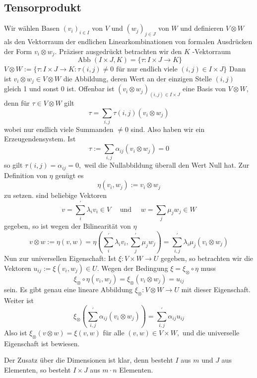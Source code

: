 \subsection{Tensorprodukt}

Wir wählen Basen $\left(v_{i}\right)_{i \in I}$ von $V$ und
$\left(w_{j}\right)_{j \in J}$ von $W$ und definieren $V \otimes W$ als den
Vektorraum der endlichen Linearkombinationen von formalen Ausdrücken der Form
$v_{i} \otimes w_{j} .$ Präziser ausgedrückt betrachten wir den $K$ -Vektorraum
\[
\operatorname{Abb}(I \times J, K)=\{\tau: I \times J \rightarrow K\}
\]
$V \otimes W:=\{\tau: I \times J \rightarrow K: \tau(i, j) \neq 0 \text { für nur endlich
viele }(i, j) \in I \times J\}$
Dann ist $v_{i} \otimes w_{j} \in V \otimes W$ die Abbildung, deren Wert an der einzigen
Stelle $(i, j)$ gleich 1 und sonst 0 ist. Offenbar ist
$\left(v_{i} \otimes w_{j}\right)_{(i, j) \in I \times J}$ eine Basis von $V \otimes W$,
denn für $\tau \in V \otimes W$ gilt
\[
\tau=\sum_{i, j} \tau(i, j)\left(v_{i} \otimes w_{j}\right)
\]
wobei nur endlich viele Summanden $\neq 0$ sind. Also haben wir ein Erzeugendensystem. Ist
\[
\tau:=\sum_{i, j} \alpha_{i j}\left(v_{i} \otimes w_{j}\right)=0
\]
so gilt $\tau(i, j)=\alpha_{i j}=0,$ weil die Nullabbildung überall den Wert Null hat.
Zur Definition von $\eta$ genügt es
\[
\eta\left(v_{i}, w_{j}\right):=v_{i} \otimes w_{j}
\]
zu setzen. sind beliebige Vektoren
\[
v=\sum_{i}^{\prime} \lambda_{i} v_{i} \in V \quad \text { und } \quad
w=\sum_{j} \mu_{j} w_{j} \in W
\]
gegeben, so ist wegen der Bilinearität von $\eta$
\[
v \otimes w:=\eta(v, w)=\eta\left(\sum_{i}^{\prime} \lambda_{i} v_{i},
\sum_{j}^{\prime} \mu_{j} w_{j}\right)=\sum_{i, j}^{\prime} \lambda_{i} \mu_{j}\left(v_{i}
\otimes w_{j}\right)
\]
Nun zur universellen Eigenschaft: Ist $\xi: V \times W \rightarrow U$ gegeben, so betrachten
wir die Vektoren $u_{i j}:=\xi\left(v_{i}, w_{j}\right) \in U .$ Wegen der Bedingung
$\xi=\xi_{\otimes} \circ \eta$ muss
\[
\xi_{\otimes} \circ \eta (v_i , w_j) = \xi_{\otimes}\left(v_{i} \otimes w_{j}\right)=u_{i j}
\]
sein. Es gibt genau eine lineare Abbildung $\xi_{\otimes}: V \otimes W \rightarrow U$
mit dieser Eigenschaft. Weiter ist 
\[
\xi_{\otimes}\left(\sum_{i, j}^{\prime} \alpha_{i j}\left(v_{i} \otimes w_{j}\right)\right)=
\sum_{i, j}^{\prime} \alpha_{i j} u_{i j}
\]
Also ist $\xi_{\otimes}(v \otimes w)=\xi(v, w)$ für alle $(v, w) \in V \times W,$ und die
universelle Eigenschaft ist bewiesen.

Der Zusatz über die Dimensionen ist klar, denn besteht $I$ aus $m$ und $J$ aus Elementen, so besteht $I \times J$ aus $m \cdot n$ Elementen.

